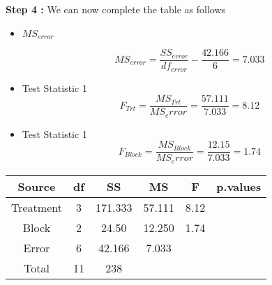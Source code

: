 \newpage


\noindent \textbf{Step 4 :} We can now complete the table as follows
\begin{itemize}
	\item $MS_{error}$
	
	\[ MS_{error} = \frac{SS_{error}}{df_{error}} - \frac{42.166}{6} = 7.033\]
	
	\item Test Statistic 1
	\[F_{Trt} = \frac{MS_{Trt}}{ MS_error } = \frac{57.111}{7.033} = 8.12 \]
	
	\item Test Statistic 1
	\[F_{Block} = \frac{MS_{Block}}{ MS_error } = \frac{12.15}{7.033} = 1.74 \]
\end{itemize}

{
	\Large
	\begin{center}
		\begin{tabular}{|c|c|c|c|c|c|}
			\hline Source	       &	df	&	SS	&	MS	&	F	&	p.values	\\ \hline
			Treatment      &	3	&	171.333	&	57.111	&	8.12	&		\\ \hline
			Block	&	2	&	24.50	&	12.250	&	1.74	&		\\ \hline
			Error	&	6	&	42.166	&	7.033	&		&		\\ \hline 
			Total	&	11	&	238	&		&\phantom{spa}		&	\phantom{spa}		\\ \hline 
		\end{tabular}
	\end{center}
}


\newpage
